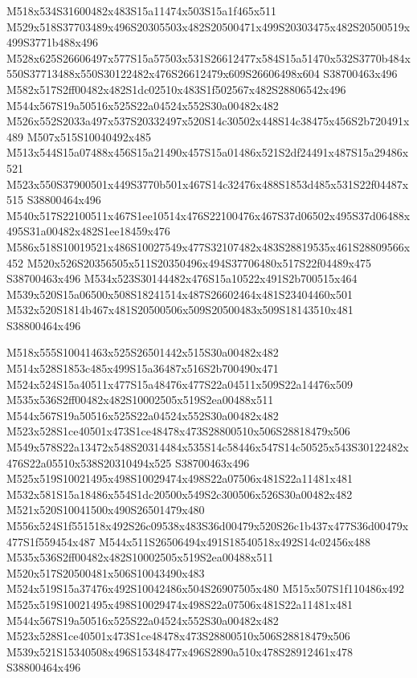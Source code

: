 \documentclass{article}
\begin{document}
\begin{multicols}{2}
M518x534S31600482x483S15a11474x503S15a1f465x511 M529x518S37703489x496S20305503x482S20500471x499S20303475x482S20500519x499S3771b488x496 M528x625S26606497x577S15a57503x531S26612477x584S15a51470x532S3770b484x550S37713488x550S30122482x476S26612479x609S26606498x604 S38700463x496 M582x517S2ff00482x482S1dc02510x483S1f502567x482S28806542x496 M544x567S19a50516x525S22a04524x552S30a00482x482 M526x552S2033a497x537S20332497x520S14c30502x448S14c38475x456S2b720491x489 M507x515S10040492x485 M513x544S15a07488x456S15a21490x457S15a01486x521S2df24491x487S15a29486x521 M523x550S37900501x449S3770b501x467S14c32476x488S1853d485x531S22f04487x515 S38800464x496 M540x517S22100511x467S1ee10514x476S22100476x467S37d06502x495S37d06488x495S31a00482x482S1ee18459x476 M586x518S10019521x486S10027549x477S32107482x483S28819535x461S28809566x452 M520x526S20356505x511S20350496x494S37706480x517S22f04489x475 S38700463x496 M534x523S30144482x476S15a10522x491S2b700515x464 M539x520S15a06500x508S18241514x487S26602464x481S23404460x501 M532x520S1814b467x481S20500506x509S20500483x509S18143510x481 S38800464x496

M518x555S10041463x525S26501442x515S30a00482x482 M514x528S1853c485x499S15a36487x516S2b700490x471 M524x524S15a40511x477S15a48476x477S22a04511x509S22a14476x509 M535x536S2ff00482x482S10002505x519S2ea00488x511 M544x567S19a50516x525S22a04524x552S30a00482x482 M523x528S1ce40501x473S1ce48478x473S28800510x506S28818479x506 M549x578S22a13472x548S20314484x535S14c58446x547S14c50525x543S30122482x476S22a05510x538S20310494x525 S38700463x496 M525x519S10021495x498S10029474x498S22a07506x481S22a11481x481 M532x581S15a18486x554S1dc20500x549S2c300506x526S30a00482x482 M521x520S10041500x490S26501479x480 M556x524S1f551518x492S26c09538x483S36d00479x520S26c1b437x477S36d00479x477S1f559454x487 M544x511S26506494x491S18540518x492S14c02456x488 M535x536S2ff00482x482S10002505x519S2ea00488x511 M520x517S20500481x506S10043490x483 M524x519S15a37476x492S10042486x504S26907505x480 M515x507S1f110486x492 M525x519S10021495x498S10029474x498S22a07506x481S22a11481x481 M544x567S19a50516x525S22a04524x552S30a00482x482 M523x528S1ce40501x473S1ce48478x473S28800510x506S28818479x506 M539x521S15340508x496S15348477x496S2890a510x478S28912461x478 S38800464x496


\end{multicols}
\end{document}
